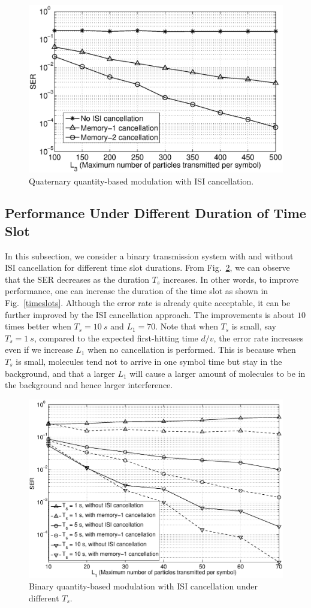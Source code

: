 \begin{figure}[htb]
\centering
\includegraphics[width=5.5in, keepaspectratio]{QM/4ary_ser_0322.eps}
\caption{Quaternary quantity-based modulation with ISI cancellation.} \label{fig:4ary_ser}
\end{figure}

\subsection{Performance Under Different Duration of Time Slot}
In this subsection, we consider a binary transmission system with and without ISI cancellation for different time slot durations. From Fig.~\ref{fig:timeslots}, we can observe that the SER decreases as the duration $T_s$ increases. In other words, to improve performance, one can increase the duration of the time slot as shown in Fig.~\ref{timeslots}. Although the error rate is already quite acceptable, it can be further improved by the ISI cancellation approach. The improvements is about $10$ times better when $T_s = 10\ s$ and $L_1=70$. Note that when $T_s$ is small, say $T_s = 1\ s$, compared to the expected first-hitting time $d/v$, the error rate increases even if we increase $L_1$ when no cancellation is performed. This is because when $T_s$ is small, molecules tend not to arrive in one symbol time but stay in the background, and that a larger $L_1$ will cause a larger amount of molecules to be in the background and hence larger interference.

\begin{figure}[htb]
\centering
\includegraphics[width=5.5in, keepaspectratio]{QM/timeslots.eps}
\caption{Binary quantity-based modulation with ISI cancellation under different $T_s$.} \label{fig:timeslots}
\end{figure}
